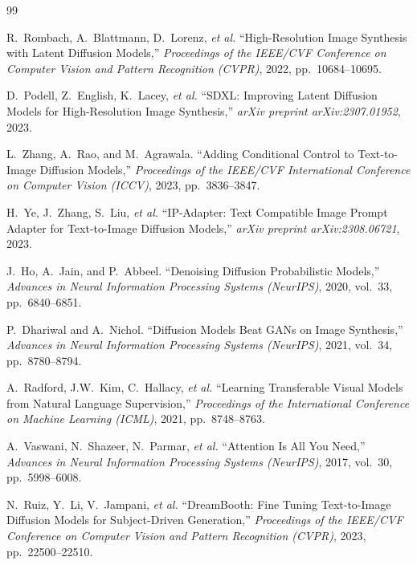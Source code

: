 \documentclass[10pt,a4paper]{article}
\begin{document}
\begin{thebibliography}{99}

R.~Rombach, A.~Blattmann, D.~Lorenz, \emph{et al.}
``High-Resolution Image Synthesis with Latent Diffusion Models,''
\emph{Proceedings of the IEEE/CVF Conference on Computer Vision and Pattern Recognition (CVPR)}, 2022, pp.~10684--10695.

D.~Podell, Z.~English, K.~Lacey, \emph{et al.}
``SDXL: Improving Latent Diffusion Models for High-Resolution Image Synthesis,''
\emph{arXiv preprint arXiv:2307.01952}, 2023.

L.~Zhang, A.~Rao, and M.~Agrawala.
``Adding Conditional Control to Text-to-Image Diffusion Models,''
\emph{Proceedings of the IEEE/CVF International Conference on Computer Vision (ICCV)}, 2023, pp.~3836--3847.

H.~Ye, J.~Zhang, S.~Liu, \emph{et al.}
``IP-Adapter: Text Compatible Image Prompt Adapter for Text-to-Image Diffusion Models,''
\emph{arXiv preprint arXiv:2308.06721}, 2023.

J.~Ho, A.~Jain, and P.~Abbeel.
``Denoising Diffusion Probabilistic Models,''
\emph{Advances in Neural Information Processing Systems (NeurIPS)}, 2020, vol.~33, pp.~6840--6851.

P.~Dhariwal and A.~Nichol.
``Diffusion Models Beat GANs on Image Synthesis,''
\emph{Advances in Neural Information Processing Systems (NeurIPS)}, 2021, vol.~34, pp.~8780--8794.

A.~Radford, J.W.~Kim, C.~Hallacy, \emph{et al.}
``Learning Transferable Visual Models from Natural Language Supervision,''
\emph{Proceedings of the International Conference on Machine Learning (ICML)}, 2021, pp.~8748--8763.

A.~Vaswani, N.~Shazeer, N.~Parmar, \emph{et al.}
``Attention Is All You Need,''
\emph{Advances in Neural Information Processing Systems (NeurIPS)}, 2017, vol.~30, pp.~5998--6008.

N.~Ruiz, Y.~Li, V.~Jampani, \emph{et al.}
``DreamBooth: Fine Tuning Text-to-Image Diffusion Models for Subject-Driven Generation,''
\emph{Proceedings of the IEEE/CVF Conference on Computer Vision and Pattern Recognition (CVPR)}, 2023, pp.~22500--22510.


\end{thebibliography}
\end{document}
